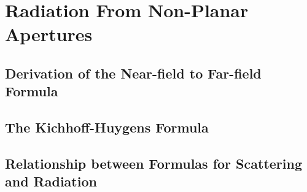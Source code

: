 \chapter{Radiation From Non-Planar Apertures}
\label{ch:nonpla}

\section{Derivation of the Near-field to Far-field Formula}

\section{The Kichhoff-Huygens Formula}

\section{Relationship between Formulas for Scattering and Radiation}
